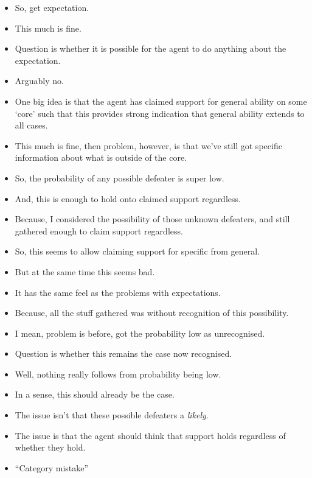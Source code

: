\begin{note}
  \large
  \begin{itemize}
  \item So, get expectation.
  \item This much is fine.
  \item Question is whether it is possible for the agent to do anything about the expectation.
  \item Arguably no.
  \item One big idea is that the agent has claimed support for general ability on some `core' such that this provides strong indication that general ability extends to all cases.
  \item This much is fine, then problem, however, is that we've still got specific information about what is outside of the core.
  \item So, the probability of any possible defeater is super low.
  \item And, this is enough to hold onto claimed support regardless.
  \item Because, I considered the possibility of those unknown defeaters, and still gathered enough to claim support regardless.
  \item So, this seems to allow claiming support for specific from general.
  \item But at the same time this seems bad.
  \item It has the same feel as the problems with expectations.
  \item Because, all the stuff gathered was without recognition of this possibility.
  \end{itemize}

  \begin{itemize}  \item I mean, problem is before, got the probability low as unrecognised.
  \item Question is whether this remains the case now recognised.
  \item Well, nothing really follows from probability being low.
  \item In a sense, this should already be the case.
  \item The issue isn't that these possible defeaters a \emph{likely}.
  \item The issue is that the agent should think that support holds regardless of whether they hold.
  \item ``Category mistake''
  \end{itemize}


\end{note}
